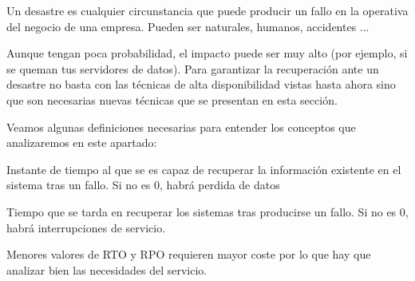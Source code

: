 Un desastre es cualquier circunstancia que puede producir un fallo en la operativa del negocio de una empresa. Pueden ser naturales, humanos, accidentes ...

Aunque tengan poca probabilidad, el impacto puede ser muy alto (por ejemplo, si se queman tus servidores de datos). Para garantizar la recuperación ante un desastre no basta con las técnicas de alta disponibilidad vistas hasta ahora sino que son necesarias nuevas técnicas que se presentan en esta sección.

Veamos algunas definiciones necesarias para entender los conceptos que analizaremos en este apartado:

\begin{defn}
Instante de tiempo al que se es capaz de recuperar la información existente en el sistema tras un fallo. Si no es 0, habrá perdida de datos
\end{defn}

\begin{defn}
Tiempo que se tarda en recuperar los sistemas tras producirse un fallo. Si no es 0, habrá interrupciones de servicio.
\end{defn}

Menores valores de RTO y RPO requieren mayor coste por lo que hay que analizar bien las necesidades del servicio.


